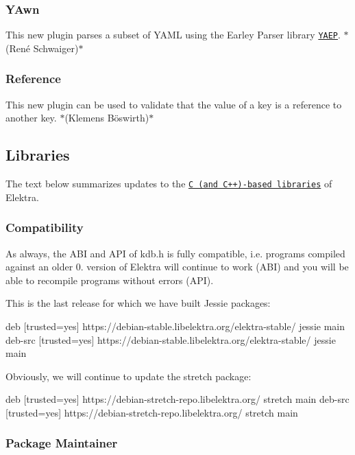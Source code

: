 \subsubsection*{Y\+Awn}

This new plugin parses a subset of Y\+A\+ML using the Earley Parser library \href{https://github.com/vnmakarov/yaep}{\tt Y\+A\+EP}. $\ast$(René Schwaiger)$\ast$

\subsubsection*{Reference}

This new plugin can be used to validate that the value of a key is a reference to another key. $\ast$(Klemens Böswirth)$\ast$

\subsection*{Libraries}

The text below summarizes updates to the \href{https://www.libelektra.org/libraries/readme}{\tt C (and C++)-\/based libraries} of Elektra.

\subsubsection*{Compatibility}

As always, the A\+BI and A\+PI of kdb.\+h is fully compatible, i.\+e. programs compiled against an older 0. version of Elektra will continue to work (A\+BI) and you will be able to recompile programs without errors (A\+PI).

This is the last release for which we have built Jessie packages\+: \begin{DoxyVerb}    deb     [trusted=yes] https://debian-stable.libelektra.org/elektra-stable/ jessie main
    deb-src [trusted=yes] https://debian-stable.libelektra.org/elektra-stable/ jessie main
\end{DoxyVerb}


Obviously, we will continue to update the stretch package\+: \begin{DoxyVerb}    deb     [trusted=yes] https://debian-stretch-repo.libelektra.org/ stretch main
    deb-src [trusted=yes] https://debian-stretch-repo.libelektra.org/ stretch main
\end{DoxyVerb}


\subsubsection*{Package Maintainer}

